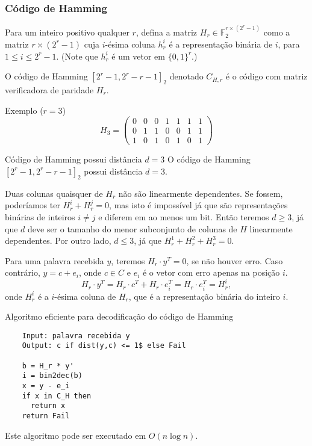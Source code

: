 \begin{frame}
  \frametitle{Código de Hamming}
  Para um inteiro positivo qualquer $r$, defina a matriz $H_r \in \mathbb{F}_2^{r \times (2^r-1)}$ como a matriz $r \times (2^r-1)$ cuja $i$-ésima coluna
  $h^i_r$ é a representação binária de $i$, para $1 \leq i \leq 2^r-1$. (Note que $h^i_r$ é um vetor em $\{0,1\}^r$.)

  O código de Hamming $[2^r-1,2^r-r-1]_2$ denotado $C_{H,r}$ é o código com matriz verificadora de paridade $H_r$.

  \vspace{3ex}
  Exemplo ($r=3$)
  \begin{equation}
    H_3 =
    \begin{pmatrix}
      0 & 0 & 0 & 1 & 1 & 1 & 1 \\
      0 & 1 & 1 & 0 & 0 & 1 & 1 \\
      1 & 0 & 1 & 0 & 1 & 0 & 1
    \end{pmatrix}
  \end{equation}

  \framebreak
  \begin{block}{Código de Hamming possui distância $d=3$}
    O código de Hamming $[2^r-1,2^r-r-1]_2$ possui distância $d=3$.

    Duas colunas quaisquer de $H_r$ não são linearmente dependentes. Se fossem, poderíamos ter $H^i_r + H^j_r = 0$, mas isto é impossível já que são
    representações binárias de inteiros $i\neq j$ e diferem em ao menos um bit. Então teremos $d \geq 3$, já que $d$ deve ser o tamanho 
    do menor subconjunto de colunas de $H$ linearmente dependentes. Por outro lado, $d \leq 3$, já que $H^1_r + H^2_r + H^3_r = 0$.
  \end{block}

  \framebreak
  Para uma palavra recebida $y$, teremos $H_r \cdot y^T = 0$, se não houver erro.
  Caso contrário, $y=c+e_i$, onde $c \in C$ e $e_i$ é o vetor com erro apenas na posição $i$.
  \begin{equation}
    H_r \cdot y^T = H_r \cdot c^T + H_r \cdot e_i^T = H_r \cdot e_i^T = H_r^i,
  \end{equation}
  onde $H_r^i$ é a $i$-ésima coluna de $H_r$, que é a representação binária do inteiro $i$.

  \framebreak
  \begin{block}{Algoritmo eficiente para decodificação do código de Hamming}
    \begin{lstlisting}
    Input: palavra recebida y
    Output: c if dist(y,c) <= 1$ else Fail

    b = H_r * y'
    i = bin2dec(b)
    x = y - e_i
    if x in C_H then
      return x
    return Fail
    \end{lstlisting}
  \end{block}
  Este algoritmo pode ser executado em $O(n \log n)$.
\end{frame}


